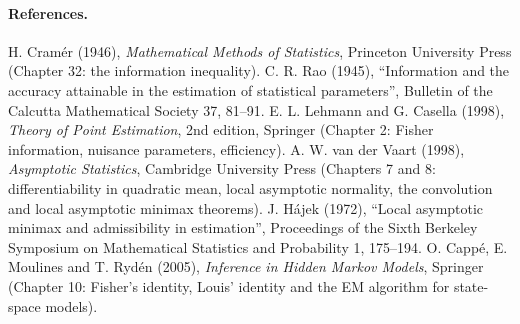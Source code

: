 \paragraph{References.}
H. Cram\'er (1946), \emph{Mathematical Methods of Statistics}, Princeton University
Press (Chapter 32: the information inequality).
C. R. Rao (1945), ``Information and the accuracy attainable in the estimation of
statistical parameters'', Bulletin of the Calcutta Mathematical Society 37, 81--91.
E. L. Lehmann and G. Casella (1998), \emph{Theory of Point Estimation}, 2nd edition,
Springer (Chapter 2: Fisher information, nuisance parameters, efficiency).
A. W. van der Vaart (1998), \emph{Asymptotic Statistics}, Cambridge University Press
(Chapters 7 and 8: differentiability in quadratic mean, local asymptotic normality, the
convolution and local asymptotic minimax theorems).
J. H\'ajek (1972), ``Local asymptotic minimax and admissibility in estimation'',
Proceedings of the Sixth Berkeley Symposium on Mathematical Statistics and
Probability 1, 175--194.
O. Capp\'e, E. Moulines and T. Ryd\'en (2005), \emph{Inference in Hidden Markov Models},
Springer (Chapter 10: Fisher's identity, Louis' identity and the EM algorithm for
state-space models).
